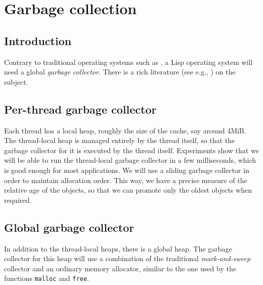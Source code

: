 \chapter{Garbage collection}
\label{chap-garbage-collection}

\section{Introduction}

Contrary to traditional operating systems such as \unix{}, a Lisp
operating system will need a global \emph{garbage collector}.  There 
is a rich literature (see e.g., \cite{Jones:2011:GCH:2025255}) on the
subject. 

\section{Per-thread garbage collector}

Each thread has a local heap, roughly the size of the cache, say
around 4MiB.  The thread-local heap is managed entirely by the thread
itself, so that the garbage collector for it is executed by the thread
itself.  Experiments show that we will be able to run the thread-local
garbage collector in a few milliseconds, which is good enough for most
applications.  We will use a sliding garbage collector in order to
maintain allocation order.  This way, we have a precise measure of the
relative age of the objects, so that we can promote only the oldest
objects when required. 

\section{Global garbage collector}

In addition to the thread-local heaps, there is a global heap.  The
garbage collector for this heap will use a combination of the
traditional \emph{mark-and-sweep} collector and an ordinary memory
allocator, similar to the one used by the \clanguage{} functions
\texttt{malloc} and \texttt{free}.
